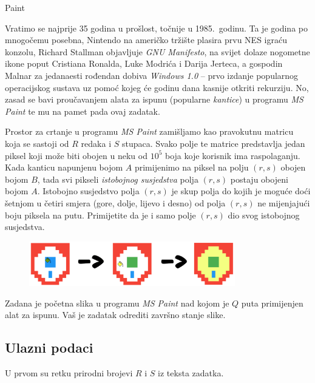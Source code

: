 \begin{statement}[
  problempoints=100,
  timelimit=1 sekunda,
  memorylimit=512 MiB,
]{Paint}

Vratimo se najprije 35 godina u prošlost, točnije u 1985.\ godinu. Ta je godina
po mnogočemu posebna, Nintendo na američko tržište plasira prvu NES igraću
konzolu, Richard Stallman objavljuje \textit{GNU Manifesto}, na svijet dolaze
nogometne ikone poput Cristiana Ronalda, Luke Modrića i Darija Jerteca, a
gospodin Malnar za jedanaesti rođendan dobiva \textit{Windows 1.0} -- prvo
izdanje popularnog operacijskog sustava uz pomoć kojeg će godinu dana kasnije
otkriti rekurziju. No, zasad se bavi proučavanjem alata za ispunu (popularne
\textit{kantice}) u programu \textit{MS Paint} te mu na pamet pada ovaj zadatak.

Prostor za crtanje u programu \textit{MS Paint} zamišljamo kao pravokutnu
matricu koja se sastoji od $R$ redaka i $S$ stupaca. Svako polje te matrice
predstavlja jedan piksel koji može biti obojen u neku od $10^5$ boja koje
korisnik ima raspolaganju. Kada kanticu napunjenu bojom $A$ primijenimo na
piksel na polju $(r, s)$ obojen bojom $B$, tada svi pikseli
\textit{istobojnog susjedstva} polja $(r, s)$ postaju obojeni bojom $A$.
Istobojno susjedstvo polja $(r, s)$ je skup polja do kojih je moguće doći
šetnjom u četiri smjera (gore, dolje, lijevo i desno) od polja $(r, s)$ ne
mijenjajući boju piksela na putu. Primijetite da je i samo polje $(r, s)$ dio
svog istobojnog susjedstva.

\begin{figure}[H]
\centering
\includegraphics[width=0.8\textwidth]{img/paint_skica.png}
\end{figure}


Zadana je početna slika u programu \textit{MS Paint} nad kojom je $Q$ puta
primijenjen alat za ispunu. Vaš je zadatak odrediti završno stanje slike.

\subsection*{Ulazni podaci}
U prvom su retku prirodni brojevi $R$ i $S$ iz teksta zadatka.


\end{statement}
